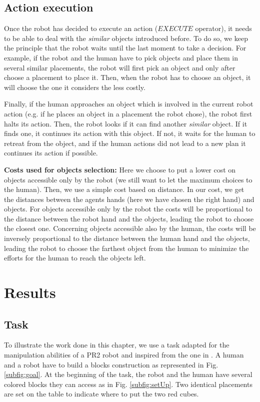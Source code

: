 \documentclass[english,a4paper,11pt,twoside]{StyleThese}
\begin{document}
\subsection{Action execution}
\label{subsec:execution}

Once the robot has decided to execute an action ($EXECUTE$ operator), it needs to be able to deal with the \textit{similar} objects introduced before. To do so, we keep the principle that the robot waits until the last moment to take a decision. For example, if the robot and the human have to pick objects and place them in several similar placements, the robot will first pick an object and only after choose a placement to place it. Then, when the robot has to choose an object, it will choose the one it considers the less costly.

Finally, if the human approaches an object which is involved in the current robot action (e.g. if he places an object in a placement the robot chose), the robot first halts its action. Then, the robot looks if it can find another \textit{similar} object. If it finds one, it continues its action with this object. If not, it waits for the human to retreat from the object, and if the human actions did not lead to a new plan it continues its action if possible.

\textbf{Costs used for objects selection:}
Here we choose to put a lower cost on objects accessible only by the robot (we still want to let the maximum choices to the human). Then, we use a simple cost based on distance. In our cost, we get the distances between the agents hands (here we have chosen the right hand) and objects. For objects accessible only by the robot the costs will be proportional to the distance between the robot hand and the objects, leading the robot to choose the closest one. Concerning objects accessible also by the human, the costs will be inversely proportional to the distance between the human hand and the objects, leading the robot to choose the farthest object from the human to minimize the efforts for the human to reach the objects left. 


\section{Results}

\subsection{Task}

To illustrate the work done in this chapter, we use a task adapted for the manipulation abilities of a PR2 robot and inspired from the one in \cite{clodic2014key}. A human and a robot have to build a blocks construction as represented in Fig. \ref{subfig:goal}. At the beginning of the task, the robot and the human have several colored blocks they can access as in Fig. \ref{subfig:setUp}. Two identical placements are set on the table to indicate where to put the two red cubes.
\end{document}
